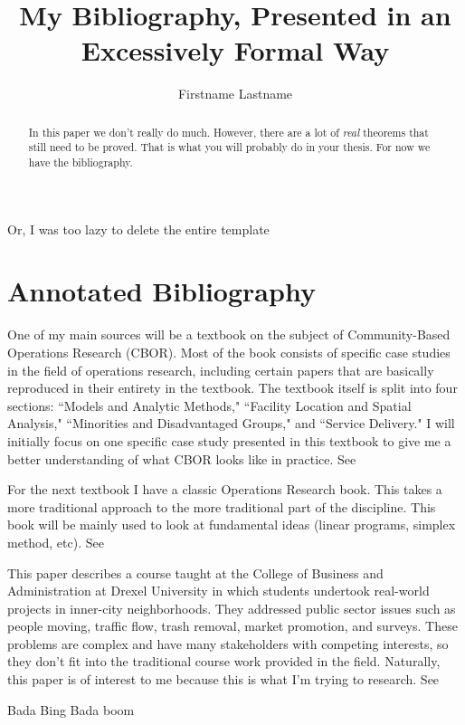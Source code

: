 \documentclass[12pt]{pom_thesis}
\author{Firstname Lastname}
\title{My Bibliography, Presented in an Excessively Formal Way}
\begin{document}
\maketitle

\begin{abstract}In this paper we don't really do much.  However, there are a lot of {\it real} theorems that still need to be proved. That is what you will probably do in your thesis. For now we have the bibliography.
\end{abstract}

\tableofcontents

\newpage
{}
\begin{chapter}{Or, I was too lazy to delete the entire template}
\label{Intro}
\section{Annotated Bibliography}



One of my main sources will be a textbook on the subject of Community-Based Operations Research (CBOR). Most of the book consists of specific case studies in the field of operations research, including certain papers that are basically reproduced in their entirety in the textbook. The textbook itself is split into four sections: ``Models and Analytic Methods," ``Facility Location and Spatial Analysis," ``Minorities and Disadvantaged Groups," and ``Service Delivery." I will initially focus on one specific case study presented in this textbook to give me a better understanding of what CBOR looks like in practice. See \cite{MJ12} \newline \newline 


For the next textbook I have a classic Operations Research book. This takes a more traditional approach to the more traditional part of the discipline. This book will be mainly used to look at fundamental ideas (linear programs, simplex method, etc). See \cite{FHGL} \newline \newline 

This paper describes a course taught at the College of Business and Administration at Drexel University in which students undertook real-world projects in inner-city neighborhoods. They addressed public sector issues such as people moving, traffic flow, trash removal, market promotion, and surveys. These problems are complex and have many stakeholders with competing interests, so they don't fit into the traditional course work provided in the field. Naturally, this paper is of interest to me because this is what I'm trying to research. See \cite{SBHM}

Bada Bing Bada boom

\end{chapter}




\end{document}
